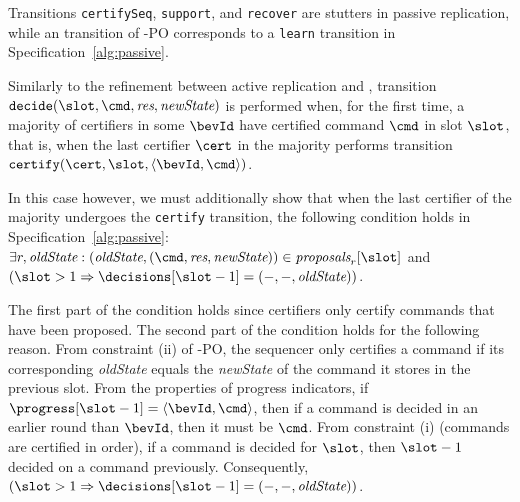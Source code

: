 Transitions \texttt{certifySeq}, \texttt{support{\Round}}, and
\texttt{recover} are stutters in passive replication, while an
\texttt{\observedecision} transition of \multiconsensus-PO
corresponds to a \texttt{learn} transition in
Specification~\ref{alg:passive}.

Similarly to the refinement between active replication and
\multiconsensus, transition $\texttt{decide}(\slot, \cmd, \textit{res},
\textit{newState})$ is performed when, for the first
time, a majority of certifiers in some {\round} $\bevId$ have certified
command $\cmd$ in slot $\slot$, that is, when the last certifier
$\cert$ in the majority performs transition $\texttt{certify}(\cert,
\slot, \langle \bevId, \cmd \rangle)$.  

In this case however, we
must additionally show that when the last certifier of the majority
undergoes the \texttt{certify} transition, the following condition
holds in Specification~\ref{alg:passive}: $\exists r, \textit{oldState} : (\textit{oldState},
(\cmd, \textit{res}, \textit{newState})) \in \textit{proposals}_r[\slot]$
and $(\slot > 1 \Rightarrow \decisions[\slot-1] = (-,-,\textit{oldState}))$.  

The first
part of the condition holds since certifiers only certify commands
that have been proposed.  The second part of the condition holds
for the following reason.  From constraint (ii) of \multiconsensus-PO, the sequencer only certifies
a command if its corresponding \textit{oldState} equals the \textit{newState} of the command it stores in the previous slot.
From the properties of progress indicators, if $\progress[\slot-1] =  \langle \bevId, \cmd \rangle$, then if a command is decided
in an earlier round than $\bevId$, then it must be $\cmd$.  From constraint (i) (commands are certified in order), if a command is decided for $\slot$, then
$\slot - 1$ decided on a command previously.  Consequently,  $(\slot > 1 \Rightarrow \decisions[\slot-1] = (-,-,\textit{oldState}))$.

